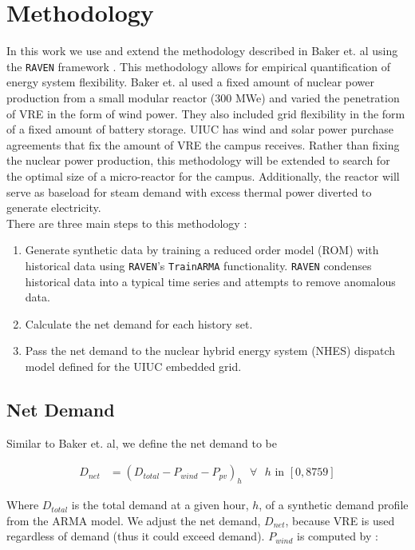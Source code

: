 \section{Methodology}

In this work we use and extend the methodology described in Baker et. al using the \texttt{RAVEN} framework \cite{baker_optimal_2018,alfonsi_raven_2016}.
This methodology allows for empirical quantification of energy system flexibility.
Baker et. al used a fixed amount of nuclear power production from a small modular reactor (300 MWe) and varied the penetration of VRE in the form of wind power.
They also included grid flexibility in the form of a fixed amount of battery storage. UIUC has wind and solar power purchase agreements that fix the amount of VRE the campus receives.
Rather than fixing the nuclear power production, this methodology will be extended to search for the optimal size of a micro-reactor for the campus.
Additionally, the reactor will serve as baseload for steam demand with excess thermal power diverted to generate electricity.\\
There are three main steps to this methodology \cite{baker_optimal_2018}: 

\begin{enumerate}
	\item Generate synthetic data by training a reduced order model (ROM) with historical data using \texttt{RAVEN}'s \texttt{TrainARMA} functionality. \texttt{RAVEN} condenses historical data into a typical time series and attempts to remove anomalous data.
	\item Calculate the net demand for each history set.
	\item Pass the net demand to the nuclear hybrid energy system (NHES) dispatch model defined for the UIUC embedded grid. 
\end{enumerate}

\subsection{Net Demand}
Similar to Baker et. al, we define the net demand to be 


\begin{equation}
	\label{eqn:net-demand}
	\begin{split}
		D_{net} & = (D_{total} - P_{wind} - P_{pv})_h \text{ $\forall$ $h$ in } [0,8759]
	\end{split}
\end{equation}

Where $D_{total}$ is the total demand at a given hour, $h$, of a synthetic demand profile from the ARMA model. We adjust the net demand, $D_{net}$, because VRE is used regardless of demand (thus it could exceed demand). $P_{wind}$ is computed by \cite{garcia_nuclear_2015}:

